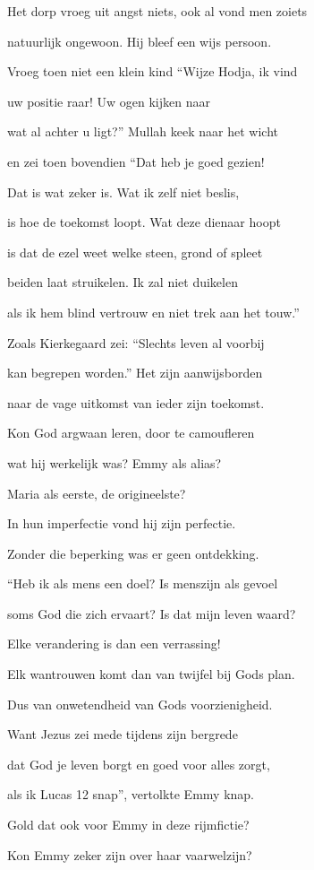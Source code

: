Het dorp vroeg uit angst niets,
ook al vond men zoiets

natuurlijk ongewoon.
Hij bleef een wijs persoon.

Vroeg toen niet een klein kind
“Wijze Hodja, ik vind

uw positie raar!
Uw ogen kijken naar

wat al achter u ligt?”
Mullah keek naar het wicht

en zei toen bovendien
“Dat heb je goed gezien!

Dat is wat zeker is.
Wat ik zelf niet beslis,

is hoe de toekomst loopt.
Wat deze dienaar hoopt

is dat de ezel weet
welke steen, grond of spleet

beiden laat struikelen.
Ik zal niet duikelen

als ik hem blind vertrouw
en niet trek aan het touw.”

Zoals Kierkegaard zei:
“Slechts leven al voorbij

kan begrepen worden.”
Het zijn aanwijsborden

naar de vage uitkomst
van ieder zijn toekomst.

Kon God argwaan leren,
door te camoufleren

wat hij werkelijk was?
Emmy als alias?

Maria als eerste,
de origineelste?

In hun imperfectie
vond hij zijn perfectie.

Zonder die beperking
was er geen ontdekking.

“Heb ik als mens een doel?
Is menszijn als gevoel

soms God die zich ervaart?
Is dat mijn leven waard?

Elke verandering
is dan een verrassing!

Elk wantrouwen komt dan
van twijfel bij Gods plan.

Dus van onwetendheid
van Gods voorzienigheid.

Want Jezus zei mede
tijdens zijn bergrede

dat God je leven borgt
en goed voor alles zorgt,

als ik Lucas 12 snap”,
vertolkte Emmy knap.

Gold dat ook voor Emmy
in deze rijmfictie?

Kon Emmy zeker zijn
over haar vaarwelzijn?
